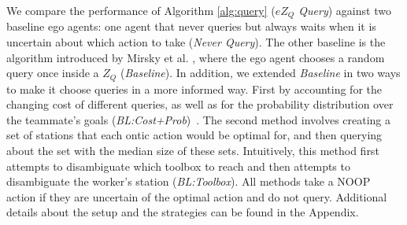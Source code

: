 \documentclass[letterpaper]{article}
\begin{document}
We compare the performance of Algorithm \ref{alg:query} (\emph{$eZ_Q$ Query}) against two baseline ego agents: one agent that never queries but always waits when it is uncertain about which action to take (\emph{Never Query}). The other baseline is the algorithm introduced by Mirsky et al. , where the ego agent chooses a random query once inside a $Z_Q$ (\emph{Baseline}). In addition, we extended \emph{Baseline} in two ways to make it choose queries in a more informed way. First by accounting for the changing cost of different queries, as well as for the probability distribution over the teammate's goals (\emph{BL:Cost+Prob})~\cite{MackeDMAP}. The second method involves creating a set of stations that each ontic action would be optimal for, and then querying about the set with the median size of these sets. Intuitively, this method first attempts to disambiguate which toolbox to reach and then attempts to disambiguate the worker's station  (\emph{BL:Toolbox}). All methods take a NOOP action if they are uncertain of the optimal action and do not query. Additional details about the setup and the strategies can be found in the Appendix.
\end{document}
